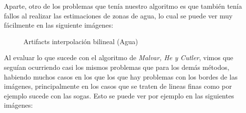 \documentclass[10pt, a4paper]{article}
\begin{document}
Aparte, otro de los problemas que ten\'ia nuestro algoritmo es que tambi\'en ten\'ia fallos al realizar las estimaciones de zonas de agua, lo cual se puede ver muy f\'acilmente en las siguiente im\'agenes:

\begin{figure}[H]
\centering
	\caption{Artifacts interpolaci\'on bilineal (Agua)} 
\end{figure}

Al evaluar lo que sucede con el algoritmo de \textit{Malvar, He y Cutler}, vimos que segu\'ian ocurriendo casi los mismos problemas que para los dem\'as m\'etodos, habiendo muchos casos en los que los que hay problemas con los bordes de las im\'agenes, principalmente en los casos que se traten de lineas finas como por ejemplo sucede con las sogas. Esto se puede ver por ejemplo en las siguientes im\'agenes:
\end{document}
